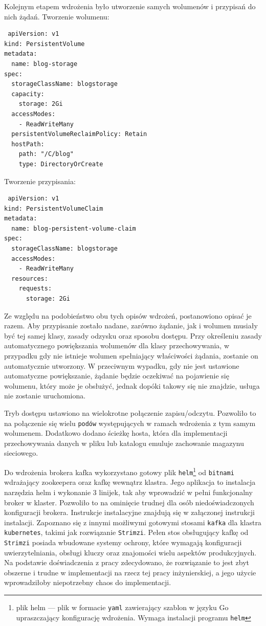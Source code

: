 \documentclass[12pt,twoside]{article}
\begin{document}
Kolejnym etapem wdrożenia było utworzenie samych wolumenów i przypisań do nich żądań. Tworzenie wolumenu:  
 \begin{lstlisting}
 apiVersion: v1
kind: PersistentVolume
metadata:
  name: blog-storage
spec:
  storageClassName: blogstorage
  capacity:
    storage: 2Gi
  accessModes:
    - ReadWriteMany
  persistentVolumeReclaimPolicy: Retain
  hostPath:
    path: "/C/blog"
    type: DirectoryOrCreate
 \end{lstlisting} 
Tworzenie przypisania:
  \begin{lstlisting}
 apiVersion: v1
kind: PersistentVolumeClaim
metadata:
  name: blog-persistent-volume-claim
spec:
  storageClassName: blogstorage
  accessModes:
    - ReadWriteMany
  resources:
    requests:
      storage: 2Gi
 \end{lstlisting} 
Ze względu na podobieństwo obu tych opisów wdrożeń, postanowiono opisać je razem.  Aby przypisanie zostało nadane, zarówno żądanie, jak i wolumen musiały być tej samej klasy, zasady odzysku oraz sposobu dostępu. Przy określeniu zasady automatycznego powiększania wolumenów dla klasy przechowywania, w przypadku gdy nie istnieje wolumen spełniający właściwości żądania, zostanie on automatycznie utworzony. W przeciwnym wypadku, gdy nie jest ustawione automatyczne powiększanie, żądanie będzie oczekiwać na pojawienie się wolumenu, który może je obsłużyć, jednak dopóki takowy się nie znajdzie, usługa nie zostanie uruchomiona.

Tryb dostępu ustawiono na wielokrotne połączenie zapisu/odczytu. Pozwoliło to na połączenie się wielu \texttt{podów} występujących w ramach wdrożenia z tym samym wolumenem. Dodatkowo dodano ścieżkę hosta, która dla implementacji przechowywania danych w pliku lub katalogu emuluje zachowanie magazynu sieciowego.
 
Do wdrożenia brokera kafka wykorzystano gotowy plik \texttt{helm}\footnote{plik helm — plik w formacie \texttt{yaml} zawierający szablon w języku Go upraszczający konfigurację wdrożenia. Wymaga instalacji programu \texttt{helm}} od \texttt{bitnami}\cite{helm} wdrażający zookeepera oraz kafkę wewnątrz klastra.
Jego aplikacja to instalacja narzędzia helm i wykonanie 3 linijek, tak aby wprowadzić w pełni funkcjonalny broker w klaster. Pozwoliło to na ominięcie trudnej dla osób niedoświadczonych konfiguracji brokera.
Instrukcje instalacyjne znajdują się w załączonej instrukcji instalacji. Zapoznano się z innymi możliwymi gotowymi stosami \texttt{kafka} dla klastra \texttt{kubernetes}, takimi jak rozwiązanie \texttt{Strimzi}. Pełen stos obsługujący kafkę od \texttt{Strimzi} posiada wbudowane systemy ochrony, które wymagają konfiguracji uwierzytelniania, obsługi kluczy oraz znajomości wielu aspektów produkcyjnych. Na podstawie doświadczenia z pracy zdecydowano, że rozwiązanie to jest zbyt obszerne i trudne w implementacji na rzecz tej pracy inżynierskiej, a jego użycie wprowadziłoby niepotrzebny chaos do implementacji.
\end{document}
